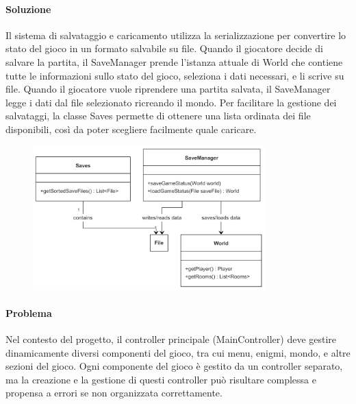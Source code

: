 \documentclass[a4paper,12pt]{report}
\begin{document}
\paragraph{Soluzione} Il sistema di salvataggio e caricamento utilizza la serializzazione per convertire lo stato del gioco in un formato salvabile su file. Quando il giocatore decide di salvare la partita, il SaveManager prende l'istanza attuale di World che contiene tutte le informazioni sullo stato del gioco, seleziona i dati necessari, e li scrive su file. Quando il giocatore vuole riprendere una partita salvata, il SaveManager legge i dati dal file selezionato ricreando il mondo. Per facilitare la gestione dei salvataggi, la classe Saves permette di ottenere una lista ordinata dei file disponibili, così da poter scegliere facilmente quale caricare.
%
\begin{figure}   %
    \centering
    \includegraphics[width=0.8\textwidth]{img/saves.png}  %
    \label{img:saves}
\end{figure}
%
\paragraph{Problema} Nel contesto del progetto, il controller principale (MainController) deve gestire dinamicamente diversi componenti del gioco, tra cui menu, enigmi, mondo, e altre sezioni del gioco. Ogni componente del gioco è gestito da un controller separato, ma la creazione e la gestione di questi controller può risultare complessa e propensa a errori se non organizzata correttamente.
\end{document}
